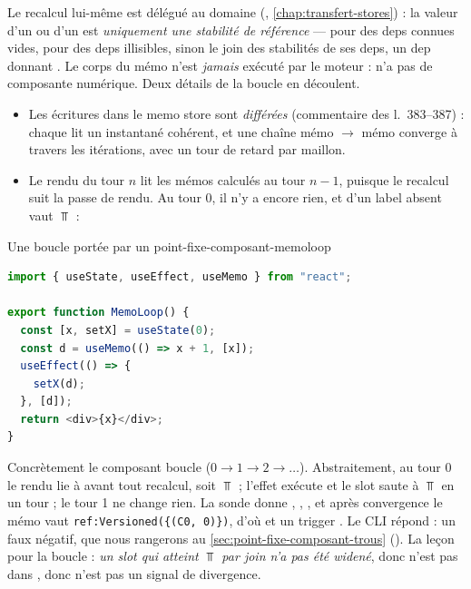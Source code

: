 Le recalcul lui-même est délégué au domaine
(, \cref{chap:transfert-stores}) : la
valeur d'un  ou d'un  est
\emph{uniquement une stabilité de référence} ---  pour des
deps \code{[]} connues vides,  pour des deps illisibles,
sinon le join des stabilités de ses deps, un dep  donnant
. Le corps du mémo n'est \emph{jamais}
exécuté par le moteur :  n'a pas de
composante numérique. Deux détails de la boucle en découlent.

\begin{itemize}
  \item Les écritures dans le memo store sont \emph{différées} (commentaire des
    l.~383--387) : chaque  lit un instantané cohérent,
    et une chaîne mémo $\to$ mémo converge \og à travers les itérations\fg,
    avec un tour de retard par maillon.
  \item Le rendu du tour $n$ lit les mémos calculés au tour $n-1$, puisque le
    recalcul suit la passe de rendu. Au tour 0, il n'y a encore rien, et
     d'un label absent vaut $\Top$ :
\end{itemize}


\begin{exemple}{Une boucle portée par un }{point-fixe-composant-memoloop}
\begin{lstlisting}[language=TypeScript,caption={\file{/tmp/ch13/memoloop.tsx}},label={lst:point-fixe-composant-memoloop}]
import { useState, useEffect, useMemo } from "react";

export function MemoLoop() {
  const [x, setX] = useState(0);
  const d = useMemo(() => x + 1, [x]);
  useEffect(() => {
    setX(d);
  }, [d]);
  return <div>{x}</div>;
}
\end{lstlisting}
Concrètement le composant boucle ($0 \to 1 \to 2 \to \dots$). Abstraitement,
au tour 0 le rendu lie  à  avant tout recalcul, soit
$\Top$ ; l'effet exécute  et le slot saute à $\Top$ en un
tour ; le tour 1 ne change rien. La sonde donne ,
, , et après convergence le
mémo vaut \texttt{ref:Versioned(\{(C0, 0)\})}, d'où
 et un trigger
. Le CLI répond  : un
faux négatif, que nous rangerons au \cref{sec:point-fixe-composant-trous}
(). La leçon pour la boucle : \emph{un slot qui atteint $\Top$ par
join n'a pas été widené}, donc n'est pas dans , donc n'est
pas un signal de divergence.
\end{exemple}

